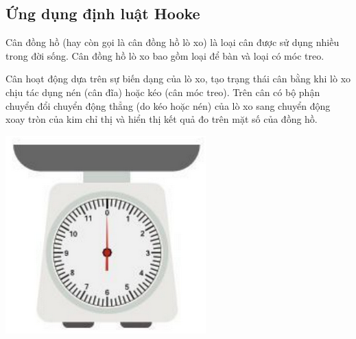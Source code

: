 \subsection{Ứng dụng định luật Hooke}
\begin{minipage}{0.6\textwidth}
	Cân đồng hồ (hay còn gọi là cân đồng hồ lò xo) là loại cân được sử dụng nhiều trong đời sống. Cân đồng hồ lò xo bao gồm loại để bàn và loại có móc treo.
	
	Cân hoạt động dựa trên sự biến dạng của lò xo, tạo trạng thái cân bằng khi lò xo chịu tác dụng nén (cân đĩa) hoặc kéo (cân móc treo). Trên cân có bộ phận chuyển đổi chuyển động thẳng (do kéo  hoặc nén) của lò xo sang chuyển động xoay tròn của kim chỉ thị và hiển thị kết quả đo trên mặt số của đồng hồ.
\end{minipage}
\begin{minipage}{0.4\textwidth}
	\begin{center}
		\includegraphics[scale=0.5]{../figs/G10-028-3}
	\end{center}
\end{minipage}

